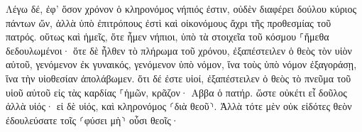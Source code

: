 \documentclass{openreader}
\begin{document}
Λέγω δέ, ἐφ’ ὅσον χρόνον ὁ κληρονόμος νήπιός ἐστιν, οὐδὲν διαφέρει δούλου κύριος πάντων ὤν, 
ἀλλὰ ὑπὸ ἐπιτρόπους ἐστὶ καὶ οἰκονόμους ἄχρι τῆς προθεσμίας τοῦ πατρός. 
οὕτως καὶ ἡμεῖς, ὅτε ἦμεν νήπιοι, ὑπὸ τὰ στοιχεῖα τοῦ κόσμου ⸀ἤμεθα δεδουλωμένοι· 
ὅτε δὲ ἦλθεν τὸ πλήρωμα τοῦ χρόνου, ἐξαπέστειλεν ὁ θεὸς τὸν υἱὸν αὐτοῦ, γενόμενον ἐκ γυναικός, γενόμενον ὑπὸ νόμον, 
ἵνα τοὺς ὑπὸ νόμον ἐξαγοράσῃ, ἵνα τὴν υἱοθεσίαν ἀπολάβωμεν. 
ὅτι δέ ἐστε υἱοί, ἐξαπέστειλεν ὁ θεὸς τὸ πνεῦμα τοῦ υἱοῦ αὐτοῦ εἰς τὰς καρδίας ⸀ἡμῶν, κρᾶζον· Αββα ὁ πατήρ. 
ὥστε οὐκέτι εἶ δοῦλος ἀλλὰ υἱός· εἰ δὲ υἱός, καὶ κληρονόμος ⸂διὰ θεοῦ⸃. 
Ἀλλὰ τότε μὲν οὐκ εἰδότες θεὸν ἐδουλεύσατε τοῖς ⸂φύσει μὴ⸃ οὖσι θεοῖς· 
\end{document}
